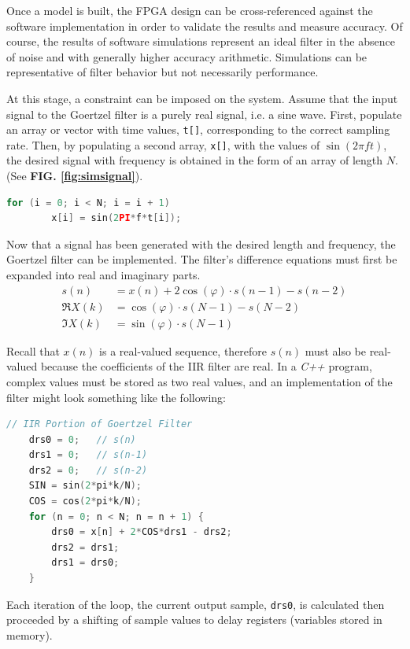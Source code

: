 \documentclass[reprint,amsmath,amssymb,aps,pra]{revtex4-2}
\begin{document}
Once a model is built, the FPGA design can be cross-referenced against the software implementation in order to validate the results and measure accuracy. Of course, the results of software simulations represent an ideal filter in the absence of noise and with generally higher accuracy arithmetic. Simulations can be representative of filter behavior but not necessarily performance.

At this stage, a constraint can be imposed on the system. Assume that the input signal to the Goertzel filter is a purely real signal, i.e. a sine wave. First, populate an array or vector with time values, \verb+t[]+, corresponding to the correct sampling rate. Then, by populating a second array, \verb+x[]+, with the values of $\sin(2\pi f t)$, the desired signal with frequency is obtained in the form of an array of length $N$. (See \textbf{FIG. \ref{fig:simsignal}}).
\begin{lstlisting}[language=C++]
    for (i = 0; i < N; i = i + 1)
        x[i] = sin(2PI*f*t[i]);
\end{lstlisting}

Now that a signal has been generated with the desired length and frequency, the Goertzel filter can be implemented. The filter's difference equations must first be expanded into real and imaginary parts.
\begin{align}
    s(n) & = x(n) + 2\cos(\varphi)\cdot s(n-1) - s(n-2) \nonumber \\
    \Re{X(k)} & = \cos(\varphi)\cdot s(N-1) - s(N-2) \nonumber \\ 
    \Im{X(k)} & = \sin(\varphi)\cdot s(N-1)
\end{align}

Recall that $x(n)$ is a real-valued sequence, therefore $s(n)$ must also be real-valued because the coefficients of the IIR filter are real. In a \textit{C++} program, complex values must be stored as two real values, and an implementation of the filter might look something like the following:

\begin{lstlisting}[language=C++]
    // IIR Portion of Goertzel Filter
    drs0 = 0;   // s(n)
    drs1 = 0;   // s(n-1)
    drs2 = 0;   // s(n-2)
    SIN = sin(2*pi*k/N);
    COS = cos(2*pi*k/N);
    for (n = 0; n < N; n = n + 1) {
        drs0 = x[n] + 2*COS*drs1 - drs2;
        drs2 = drs1;
        drs1 = drs0;
    }
\end{lstlisting}

Each iteration of the loop, the current output sample, \verb+drs0+, is calculated then proceeded by a shifting of sample values to delay registers (variables stored in memory).
\end{document}
